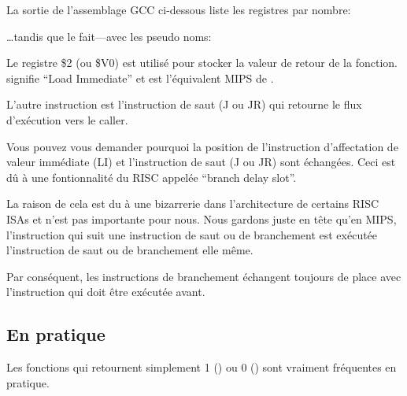\label{MIPS_leaf_function_ex1}

La sortie de l'assemblage GCC ci-dessous liste les registres par nombre:



\dots tandis que \IDA le fait---avec les pseudo noms:



Le registre \$2 (ou \$V0) est utilisé pour stocker la valeur de retour de la fonction.
 signifie ``Load Immediate'' et est l'équivalent MIPS de \MOV.


L'autre instruction est l'instruction de saut (J ou JR) qui retourne le flux d'exécution vers le \gls{caller}.


Vous pouvez vous demander pourquoi la position de l'instruction d'affectation de valeur immédiate (LI) et l'instruction de saut (J ou JR) sont échangées. Ceci est dû à une fontionnalité du \ac{RISC} appelée ``branch delay slot''.

La raison de cela est du à une bizarrerie dans l'architecture de certains RISC \ac{ISA}s et n'est pas importante pour nous. Nous gardons juste en tête qu'en MIPS, l'instruction qui suit une instruction de saut ou de branchement est exécutée  l'instruction de saut ou de branchement elle même.

Par conséquent, les instructions de branchement échangent toujours de place avec l'instruction qui doit être exécutée avant.


\subsection{En pratique}

Les fonctions qui retournent simplement 1 () ou 0 () sont vraiment fréquentes en pratique.


